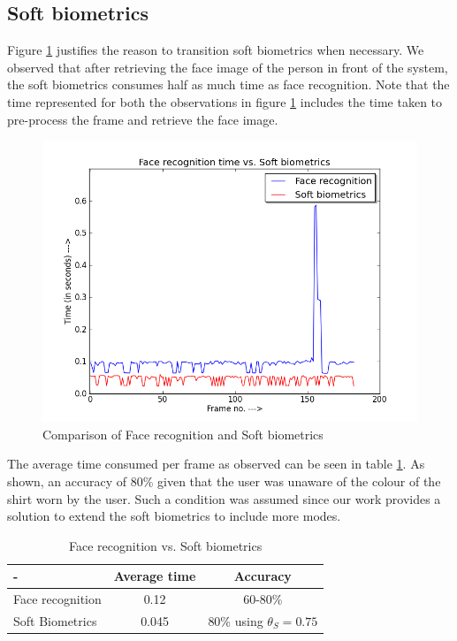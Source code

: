 \documentclass[%
        final,
        notitlepage,
        narroweqnarray,
        inline,
        ]{ieee}
\begin{document}
\subsection{Soft biometrics}
Figure \ref{fig:fsoft} justifies the reason to transition soft biometrics when necessary.
We observed that after retrieving the face image of the person in front of the system, the soft biometrics consumes half as much time as face recognition.
Note that the time represented for both the observations in figure \ref{fig:fsoft} includes the time taken to pre-process the frame and retrieve the face image.
\begin{figure}[h!]
	\centering
	\includegraphics[scale=0.40]{img/face_vs_soft.png}
	\caption{Comparison of Face recognition and Soft biometrics}
	\label{fig:fsoft}
\end{figure}
The average time consumed per frame as observed can be seen in table \ref{tab:frsb}.
As shown, an accuracy of 80\% given that the user was unaware of the colour of the shirt worn by the user.
Such a condition was assumed since our work provides a solution to extend the soft biometrics to include more modes.
\begin{table}[htp]
	\centering
	\caption{Face recognition vs. Soft biometrics}
	\begin{tabular}{||l|c|c||} \hline \hline
	-                  &  Average time  &  Accuracy \\ \hline
	Face recognition   &  0.12          &  60-80\% \\ \hline
	Soft Biometrics    &  0.045         &  80\% using $\theta_{S}=0.75$ \\ \hline \hline
	\end{tabular}
	\label{tab:frsb}
\end{table}
\end{document}
